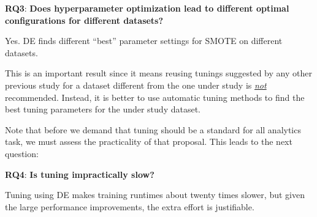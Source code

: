 \documentclass[10pt,conference]{IEEEtran}
\theoremstyle{break}
\theoremstyle{break}
\begin{document}
 \textbf{RQ3}: \textbf{Does hyperparameter optimization lead to different optimal configurations for different datasets?} 
 
 \begin{lesson}Yes. DE finds different ``best'' parameter settings for SMOTE on different datasets.
 \end{lesson}
  This is an important result
  since it means
  reusing tunings suggested  by  any other  previous study  for a dataset different from the one under study is \underline{{\em not}} recommended. Instead,  it is better to
      use automatic tuning  methods  to find the best tuning parameters for the 
      under study dataset.
      
       Note that
 before we demand that tuning should be a
 standard for all analytics task,
 we must assess the practicality of that
 proposal. This leads to the next question:
 
   \textbf{RQ4}: \textbf{Is tuning 
   impractically
   slow?} 
 
 \begin{lesson}Tuning using DE makes training runtimes about twenty times slower, but given
 the large performance improvements,
 the extra effort is justifiable. \end{lesson}
 
 
 
\end{document}
